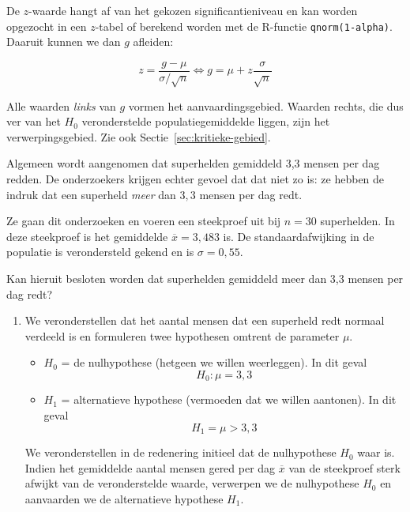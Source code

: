 \begin{enumerate}
  De $z$-waarde hangt af van het gekozen significantieniveau en kan worden opgezocht in een $z$-tabel of berekend worden met de R-functie \texttt{qnorm(1-alpha)}. Daaruit kunnen we dan $g$ afleiden:
  
  \begin{equation}
  z = \frac{g-\mu}{\sigma/\sqrt{n}} \Leftrightarrow g = \mu + z \frac{\sigma}{\sqrt{n}}
  \label{eq:kritieke-grenswaarde-z-toets}
  \end{equation}

  Alle waarden \emph{links} van $g$ vormen het aanvaardingsgebied. Waarden rechts, die dus ver van het $H_0$ veronderstelde populatiegemiddelde liggen, zijn het verwerpingsgebied. Zie ook Sectie~\ref{sec:kritieke-gebied}.
\end{enumerate}

\begin{example}
  \label{ex:hypothesetoets-dagelijkse-reddingen}
  Algemeen wordt aangenomen dat superhelden gemiddeld 3,3 mensen per dag redden. De onderzoekers krijgen echter gevoel dat dat niet zo is: ze hebben de indruk dat een superheld \emph{meer} dan $3,3$ mensen per dag redt.
  
  Ze gaan dit onderzoeken en voeren een steekproef uit bij $n = 30$ superhelden. In deze steekproef is het gemiddelde $\overline{x} = 3,483$ is. De standaardafwijking in de populatie is verondersteld gekend en is $\sigma = 0,55$.
  
  Kan hieruit besloten worden dat superhelden gemiddeld meer dan 3,3 mensen per dag redt?

  \begin{enumerate}
    \item We veronderstellen dat het aantal mensen dat een superheld redt normaal verdeeld  is en formuleren twee hypothesen omtrent de parameter $\mu$.
    \begin{itemize}
      \item $H_{0}$ = de nulhypothese (hetgeen we willen weerleggen). In dit geval \[ H_{0} : \mu = 3,3 \]
      \item $H_{1}$ = alternatieve hypothese (vermoeden dat we willen aantonen). In dit geval \[H_{1}= \mu > 3,3 \]
    \end{itemize}
  
    We veronderstellen in de redenering initieel dat de nulhypothese $H_{0}$ waar is. Indien het gemiddelde aantal mensen gered per dag $\overline{x}$ van de steekproef sterk afwijkt van de veronderstelde waarde, verwerpen we de nulhypothese $H_{0}$ en aanvaarden we de alternatieve hypothese $H_{1}$.
    

\end{enumerate}
\end{example}
